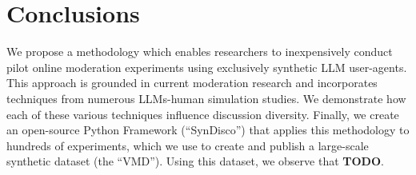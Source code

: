 %
\section{Conclusions}

We propose a methodology which enables researchers to inexpensively conduct pilot online moderation experiments using exclusively synthetic \ac{LLM} user-agents. This approach is grounded in current moderation research and incorporates techniques from numerous \acp{LLM}-human simulation studies. We demonstrate how each of these various techniques influence discussion diversity. Finally, we create an open-source Python Framework (“SynDisco”) that applies this methodology to hundreds of experiments, which we use to create and publish a large-scale synthetic dataset (the “\acf{VMD}”). Using this dataset, we observe that \textbf{TODO}.
